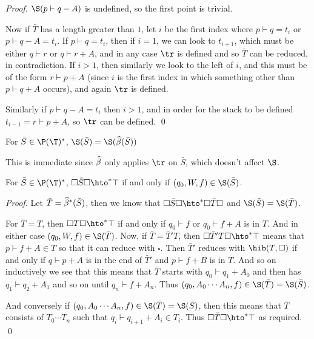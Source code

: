 \documentclass{llncs}
\begin{document}
\begin{proof}

    $\S(p\vdash q- A)$ is undefined, so the first point is trivial.

    Now if $\bar T$ has a length greater than $1$, let $i$ be the first index where $p\vdash q=t_i$ or $p\vdash q- A=t_i$.
    If $p\vdash q=t_i$, then if $i=1$, we can look to $t_{i+1}$, which must be either $q\vdash r$ or $q\vdash r+ A$, and in any case $\tr$ is defined and so $\bar T$ can be reduced, in contradiction.
    If $i>1$, then similarly we look to the left of $i$, and this must be of the form $r\vdash p+ A$ (since $i$ is the first index in which something other than $p\vdash q+ A$ occurs), and again $\tr$ is defined.

    Similarly if $p\vdash q- A=t_i$ then $i>1$, and in order for the stack to be defined $t_{i-1}=r\vdash p+ A$, so $\tr$ can be defined.
    \qed

\end{proof}

\begin{lemma}

    For $\bar S\in\P(\T)^*$, $\S(\bar S)=\S(\hb(\bar S))$

\end{lemma}

This is immediate since $\widehat\beta$ only applies $\tr$ on $\bar S$, which doesn't affect $\S$.

\begin{lemma}

    For $\bar S\in\P(\T)^*$, $\square\bar S\square\hto^*\top$ if and only if $(q_0,W,f)\in \S(\bar S)$.

\end{lemma}

\begin{proof}

    Let $\bar T=\widehat\beta^*(\bar S)$, then we know that $\square\bar S\square\hto^*\square\bar T\square$ and $\S(\bar S)=\S(\bar T)$.

    For $\bar T=T$, then $\square T\square\hto^*\top$ if and only if $q_0\vdash f$ or $q_0\vdash f+ A$ is in $T$.
    And in either case $(q_0,W,f)\in\S(\bar T)$.
    Now, if $\bar T=\bar T'T$, then $\square\bar T'T\square\hto^*\top$ means that $p\vdash f+ A\in T$ so that it can reduce with $\square$.
    Then $\bar T'$ reduces with $\hib(T,\square)$ if and only if $q\vdash p+ A$ is in the end of $\bar T'$ and $p\vdash f+ B$ is in $T$.
    And so on inductively we see that this means that $\bar T$ starts with $q_0\vdash q_1+ A_0$ and then has $q_1\vdash q_2+ A_1$ and so on until $q_n\vdash f+ A_n$.
    Thus $(q_0,A_0\cdots A_n,f)\in\S(\bar T)=\S(\bar S)$.

    And conversely if $(q_0,A_0\cdots A_n,f)\in\S(\bar T)=\S(\bar S)$, then this means that $\bar T$ consists of $T_0\cdots T_n$ such that $q_i\vdash q_{i+1}+ A_i\in T_i$.
    Thus $\square\bar T\square\hto^*\top$ as required.
    \qed

\end{proof}
\end{document}

